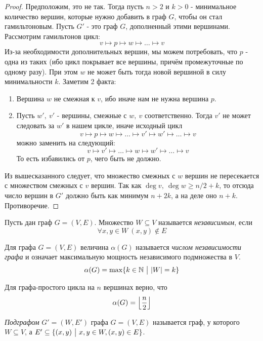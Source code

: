 \begin{proof}
	Предположим, это не так. Тогда пусть $n > 2$ и $k > 0$ - минимальное количество вершин, которые нужно добавить в граф $G$, чтобы он стал гамильтоновым. Пусть $G'$ - это граф $G$, дополненный этими вершинами. Рассмотрим гамильтонов цикл:
	\[
		v \mapsto p \mapsto w \mapsto \ldots \mapsto v
	\]
	Из-за необходимости дополнительных вершин, мы можем потребовать, что $p$ - одна из таких (ибо цикл покрывает все вершины, причём промежуточные по одному разу). При этом $w$ не может быть тогда новой вершиной в силу минимальности $k$. Заметим 2 факта:
	\begin{enumerate}
		\item Вершина $w$ не смежная к $v$, ибо иначе нам не нужна вершина $p$.
		
		\item Пусть $w',\ v'$ - вершины, смежные с $w,\ v$ соответственно. Тогда $v'$ не может следовать за $w'$ в нашем цикле, иначе исходный цикл
		\[
			v \mapsto p \mapsto w \mapsto \ldots \mapsto v' \mapsto w' \mapsto \ldots \mapsto v
		\]
		можно заменить на следующий:
		\[
			v \mapsto v' \mapsto \ldots \mapsto w \mapsto w' \mapsto \ldots \mapsto v
		\]
		То есть избавились от $p$, чего быть не должно.
	\end{enumerate}
	Из вышесказанного следует, что множество смежных с $w$ вершин не пересекается с множеством смежных с $v$ вершин. Так как $\deg v,\ \deg w \ge n/2 + k$, то отсюда число вершин в $G'$ должно быть как минимум $n + 2k$, а на деле оно $n + k$. Противоречие.
\end{proof}

\begin{definition}
	Пусть дан граф $G = (V, E)$. Множество $W \subseteq V$ называется \textit{независимым}, если
	\[
		\forall x, y \in W\ (x, y) \notin E
	\]
\end{definition}

\begin{definition}
	Для графа $G = (V, E)$ величина $\alpha(G)$ называется \textit{числом независимости графа} и означает максимальную мощность независимого подмножества в $V$.
	\[
		\alpha(G) = \max \{k \in \mathbb{N} \ \big|\  |W| = k\}
	\]
\end{definition}

\begin{example}
	Для графа-простого цикла на $n$ вершинах верно, что
	\[
		\alpha(G) = \left\lfloor \frac{n}{2} \right\rfloor
	\]
\end{example}

\begin{definition}
	\textit{Подграфом} $G' = (W, E')$ графа $G = (V, E)$ называется граф, у которого $W \subseteq V$, а $E' \subseteq \{(x, y) \ \big|\  x, y \in W, (x, y) \in E\}$.
\end{definition}

